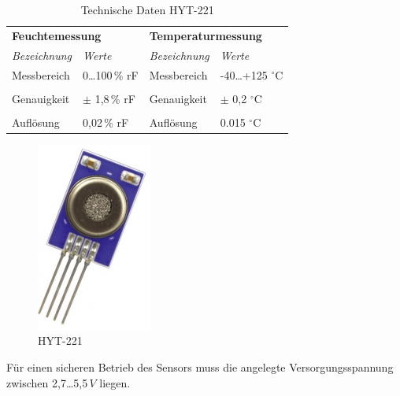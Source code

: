 \begin{table}[H]
\centering
\begin{tabular}{
llll
}
\toprule
\multicolumn{2}{p{7cm}}{\centering\textbf{Feuchtemessung}} & \multicolumn{2}{p{7cm}}{\centering\textbf{Temperaturmessung} } \\
\multicolumn{1}{p{4cm}}{\textit{Bezeichnung}} & \multicolumn{1}{p{3cm}}{\centering\textit{Werte} }&\multicolumn{1}{p{4cm}}{\textit{Bezeichnung}} & \multicolumn{1}{p{3cm}}{\centering\textit{Werte} }\\\midrule
Messbereich & 0\dots 100\,\% rF & Messbereich  & -40\dots +125 $^\circ\text{C}$ \\
&&&\\
Genauigkeit & $\pm$ 1,8\,\% rF& Genauigkeit & $\pm$ 0,2 $^\circ\text{C}$\\
&&&\\
Auflösung & 0,02\,\% rF & Auflösung & 0.015 $^\circ\text{C}$\\
\bottomrule
\end{tabular}
\caption{Technische Daten HYT-221 \citep{Datenblatt_HYT221}}
\label{Tabelle_Technische_Daten_HYT221}
\end{table}



\begin{figure}[!h] 
  \centering
     \includegraphics[scale=.4]{BilderAllgemein/HYT221.png}
  \caption{HYT-221 \citep{Bild_HYT221}}
  \label{Abb_HYT221}
\end{figure}

Für einen sicheren Betrieb des Sensors muss die angelegte Versorgungsspannung zwischen 2,7\dots 5,5\,$V$ liegen.

